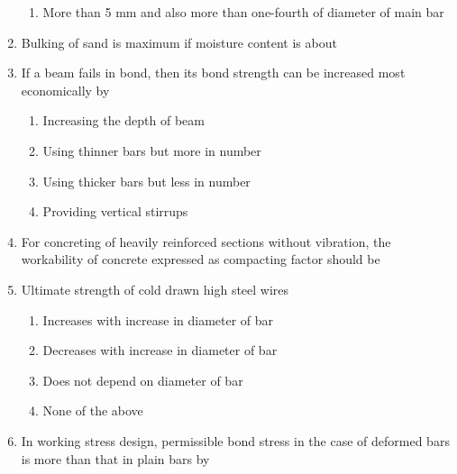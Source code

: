 \documentclass[11pt,a4paper]{article}
\begin{document}
\begin{enumerate}
\begin{enumerate}[label=\Alph*.]
\item{More than 5 mm and also more than one-fourth of diameter of main bar}
\end{enumerate}
\item{Bulking of sand is maximum if moisture content is about}
\\
\item{If a beam fails in bond, then its bond strength can be increased most economically by}
\begin{enumerate}[label=\Alph*.]
\item{Increasing the depth of beam}
\item{Using thinner bars but more in number}
\item{Using thicker bars but less in number}
\item{Providing vertical stirrups}
\end{enumerate}
\item{For concreting of heavily reinforced sections without vibration, the workability of concrete expressed as compacting factor should be}
\\
\item{Ultimate strength of cold drawn high steel wires}
\begin{enumerate}[label=\Alph*.]
\item{Increases with increase in diameter of bar}
\item{Decreases with increase in diameter of bar}
\item{Does not depend on diameter of bar}
\item{None of the above}
\end{enumerate}
\item{In working stress design, permissible bond stress in the case of deformed bars is more than that in plain bars by}
\\\begin{enumerate*}[itemjoin=\qquad, label=\Alph*.]

\end{enumerate*}
\end{enumerate}
\end{document}
